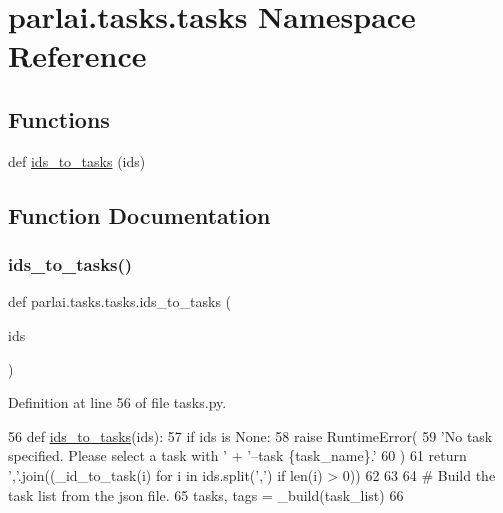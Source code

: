 \hypertarget{namespaceparlai_1_1tasks_1_1tasks}{}\section{parlai.\+tasks.\+tasks Namespace Reference}
\label{namespaceparlai_1_1tasks_1_1tasks}
\subsection*{Functions}
\begin{DoxyCompactItemize}
\item 
def \hyperlink{namespaceparlai_1_1tasks_1_1tasks_ad536d1295ca5ba2ecf3a48635b482087}{ids\+\_\+to\+\_\+tasks} (ids)
\end{DoxyCompactItemize}


\subsection{Function Documentation}
\mbox{\label{namespaceparlai_1_1tasks_1_1tasks_ad536d1295ca5ba2ecf3a48635b482087}} 
\subsubsection{\texorpdfstring{ids\+\_\+to\+\_\+tasks()}{ids\_to\_tasks()}}
{\footnotesize\ttfamily def parlai.\+tasks.\+tasks.\+ids\+\_\+to\+\_\+tasks (\begin{DoxyParamCaption}\item[{}]{ids }\end{DoxyParamCaption})}



Definition at line 56 of file tasks.\+py.


\begin{DoxyCode}
56 \textcolor{keyword}{def }\hyperlink{namespaceparlai_1_1tasks_1_1tasks_ad536d1295ca5ba2ecf3a48635b482087}{ids\_to\_tasks}(ids):
57     \textcolor{keywordflow}{if} ids \textcolor{keywordflow}{is} \textcolor{keywordtype}{None}:
58         \textcolor{keywordflow}{raise} RuntimeError(
59             \textcolor{stringliteral}{'No task specified. Please select a task with '} + \textcolor{stringliteral}{'--task \{task\_name\}.'}
60         )
61     \textcolor{keywordflow}{return} \textcolor{stringliteral}{','}.join((\_id\_to\_task(i) \textcolor{keywordflow}{for} i \textcolor{keywordflow}{in} ids.split(\textcolor{stringliteral}{','}) \textcolor{keywordflow}{if} len(i) > 0))
62 
63 
64 \textcolor{comment}{# Build the task list from the json file.}
65 tasks, tags = \_build(task\_list)
66 \end{DoxyCode}
